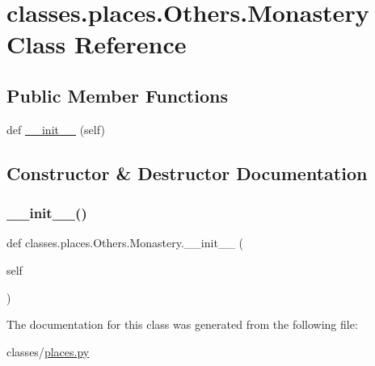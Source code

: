 \hypertarget{classclasses_1_1places_1_1Others_1_1Monastery}{}\section{classes.\+places.\+Others.\+Monastery Class Reference}
\label{classclasses_1_1places_1_1Others_1_1Monastery}
\subsection*{Public Member Functions}
\begin{DoxyCompactItemize}
\item 
def \hyperlink{classclasses_1_1places_1_1Others_1_1Monastery_a75763f966a44e9a8c5e2a45da45403ea}{\+\_\+\+\_\+init\+\_\+\+\_\+} (self)
\end{DoxyCompactItemize}


\subsection{Constructor \& Destructor Documentation}
\mbox{\label{classclasses_1_1places_1_1Others_1_1Monastery_a75763f966a44e9a8c5e2a45da45403ea}} 
\subsubsection{\texorpdfstring{\+\_\+\+\_\+init\+\_\+\+\_\+()}{\_\_init\_\_()}}
{\footnotesize\ttfamily def classes.\+places.\+Others.\+Monastery.\+\_\+\+\_\+init\+\_\+\+\_\+ (\begin{DoxyParamCaption}\item[{}]{self }\end{DoxyParamCaption})}



The documentation for this class was generated from the following file\+:\begin{DoxyCompactItemize}
\item 
classes/\hyperlink{places_8py}{places.\+py}\end{DoxyCompactItemize}
